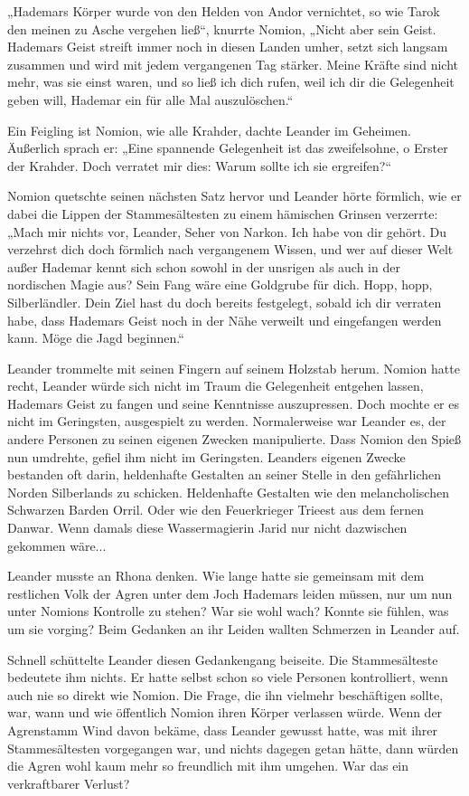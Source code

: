 \documentclass[10pt, a4paper, oneside]{book}
\begin{document}
„Hademars Körper wurde von den Helden von Andor vernichtet, so wie Tarok den meinen zu Asche vergehen ließ“, knurrte Nomion, „Nicht aber sein Geist. Hademars Geist streift immer noch in diesen Landen umher, setzt sich langsam zusammen und wird mit jedem vergangenen Tag stärker. Meine Kräfte sind nicht mehr, was sie einst waren, und so ließ ich dich rufen, weil ich dir die Gelegenheit geben will, Hademar ein für alle Mal auszulöschen.“

Ein Feigling ist Nomion, wie alle Krahder, dachte Leander im Geheimen. Äußerlich sprach er: „Eine spannende Gelegenheit ist das zweifelsohne, o Erster der Krahder. Doch verratet mir dies: Warum sollte ich sie ergreifen?“

Nomion quetschte seinen nächsten Satz hervor und Leander hörte förmlich, wie er dabei die Lippen der Stammesältesten zu einem hämischen Grinsen verzerrte: „Mach mir nichts vor, Leander, Seher von Narkon. Ich habe von dir gehört. Du verzehrst dich doch förmlich nach vergangenem Wissen, und wer auf dieser Welt außer Hademar kennt sich schon sowohl in der unsrigen als auch in der nordischen Magie aus? Sein Fang wäre eine Goldgrube für dich. Hopp, hopp, Silberländler. Dein Ziel hast du doch bereits festgelegt, sobald ich dir verraten habe, dass Hademars Geist noch in der Nähe verweilt und eingefangen werden kann. Möge die Jagd beginnen.“

Leander trommelte mit seinen Fingern auf seinem Holzstab herum. Nomion hatte recht, Leander würde sich nicht im Traum die Gelegenheit entgehen lassen, Hademars Geist zu fangen und seine Kenntnisse auszupressen. Doch mochte er es nicht im Geringsten, ausgespielt zu werden. Normalerweise war Leander es, der andere Personen zu seinen eigenen Zwecken manipulierte. Dass Nomion den Spieß nun umdrehte, gefiel ihm nicht im Geringsten. Leanders eigenen Zwecke bestanden oft darin, heldenhafte Gestalten an seiner Stelle in den gefährlichen Norden Silberlands zu schicken. Heldenhafte Gestalten wie den melancholischen Schwarzen Barden Orril. Oder wie den Feuerkrieger Trieest aus dem fernen Danwar. Wenn damals diese Wassermagierin Jarid nur nicht dazwischen gekommen wäre...

Leander musste an Rhona denken. Wie lange hatte sie gemeinsam mit dem restlichen Volk der Agren unter dem Joch Hademars leiden müssen, nur um nun unter Nomions Kontrolle zu stehen? War sie wohl wach? Konnte sie fühlen, was um sie vorging? Beim Gedanken an ihr Leiden wallten Schmerzen in Leander auf.

Schnell schüttelte Leander diesen Gedankengang beiseite. Die Stammesälteste bedeutete ihm nichts. Er hatte selbst schon so viele Personen kontrolliert, wenn auch nie so direkt wie Nomion. Die Frage, die ihn vielmehr beschäftigen sollte, war, wann und wie öffentlich Nomion ihren Körper verlassen würde. Wenn der Agrenstamm Wind davon bekäme, dass Leander gewusst hatte, was mit ihrer Stammesältesten vorgegangen war, und nichts dagegen getan hätte, dann würden die Agren wohl kaum mehr so freundlich mit ihm umgehen. War das ein verkraftbarer Verlust?
\end{document}
